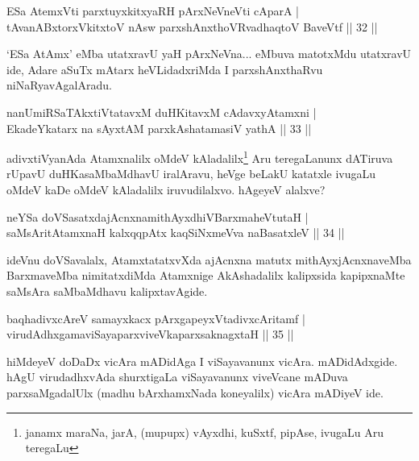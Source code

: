
\begin{shl}
ESa AtemxVti parxtuyxkitxyaRH pArxNeVneVti cAparA |\\
tAvanABxtorxVkitxtoV nAsw parxshAnxthoVR\s vadhaqtoV BaveVtf \hfill || 32 ||
\end{shl}

\begin{artha}
`ESa AtAmx' eMba utatxravU yaH pArxNeVna... eMbuva matotxMdu utatxravU ide, Adare aSuTx mAtarx heVLidadxriMda I parxshAnxthaRvu niNaRyavAgalAradu.
\end{artha}


\begin{shl}
nanUmiRSaTAkxtiVtatavxM duHKitavxM cAdavxyAtamxni |\\
EkadeYkatarx na sAyxtAM parxkAshatamasiV yathA \hfill || 33 ||
\end{shl}

\begin{artha}
adivxtiVyanAda Atamxnalilx oMdeV kAladalilx\footnote{janamx maraNa, jarA, (mupupx) vAyxdhi, kuSxtf, pipAse, ivugaLu Aru teregaLu}  Aru teregaLanunx dATiruva rUpavU duHKasaMbaMdhavU iralAravu, heVge beLakU katatxle ivugaLu oMdeV kaDe oMdeV kAladalilx iruvudilalxvo. hAgeyeV alalxve? 
\end{artha}


\begin{shl}
neYSa doVSasatxdajAcnxnamithAyxdhiVBarxmaheVtutaH |\\
saMsAritA\s \s tamxnaH kalxqqpAtx kaqSiNxmeVva naBasatxleV \hfill || 34 ||
\end{shl}

\begin{artha}%
ideVnu doVSavalalx, AtamxtatatxvXda ajAcnxna matutx mithAyxjAcnxnaveMba BarxmaveMba nimitatxdiMda Atamxnige AkAshadalilx kalipxsida kapipxnaMte saMsAra saMbaMdhavu kalipxtavAgide.
\end{artha}

\begin{shl}
baqhadivxcAreV samayxkacx pArxgapeyxVtadivxcAritamf |\\
virudAdhxgamaviSayaparxviveVkaparxsaknagxtaH \hfill || 35 ||
\end{shl}

\begin{artha}
hiMdeyeV doDaDx vicAra mADidAga I viSayavanunx vicAra. mADidAdxgide. hAgU virudadhxvAda shurxtigaLa viSayavanunx viveVcane mADuva parxsaMgadalUlx (madhu bArxhamxNada koneyalilx) vicAra mADiyeV ide.
\end{artha}

